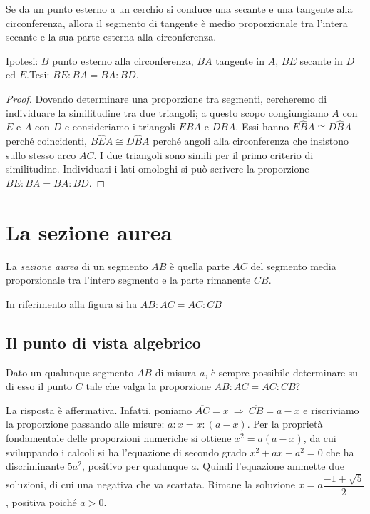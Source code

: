 \begin{teorema}
Se da un punto esterno a un cerchio si conduce una secante e una tangente alla circonferenza, allora il segmento di tangente è medio proporzionale tra l'intera secante e la sua parte esterna alla circonferenza.
\end{teorema}

\noindent Ipotesi: $B$ punto esterno alla circonferenza, $BA$ tangente in $A$, $BE$ secante in $D$ ed $E$.\tab Tesi: $BE:BA=BA:BD$.

\begin{proof}
Dovendo determinare una proporzione tra segmenti, cercheremo di individuare la similitudine tra due triangoli; a questo scopo congiungiamo $A$ con $E$ e $A$ con $D$ e consideriamo i triangoli $EBA$ e $DBA$. Essi hanno $E\widehat{B}A\cong D\widehat{B}A$ perché coincidenti, $B\widehat{E}A\cong D\widehat{B}A$ perché angoli alla circonferenza che insistono sullo stesso arco $AC$. I due triangoli sono simili per il primo criterio di similitudine. Individuati i lati omologhi si può scrivere la proporzione $BE:BA=BA:BD$.
\end{proof}

\section{La sezione aurea}

\begin{definizione}
La \emph{sezione aurea} di un segmento $AB$ è quella parte $AC$ del segmento media proporzionale tra l'intero segmento e la parte rimanente $CB$.
\end{definizione}

In riferimento alla figura si ha $AB : AC = AC : CB$

\subsection{Il punto di vista algebrico}

Dato un qualunque segmento $AB$ di misura $a$, è sempre possibile determinare su di esso il punto $C$ tale che valga la proporzione $AB : AC = AC : CB$?

La risposta è affermativa. Infatti, poniamo $\overline{AC}=x\:\Rightarrow\:\overline{CB}=a-x$ e riscriviamo la proporzione passando alle misure: $a : x = x : (a-x)$.
Per la proprietà fondamentale delle proporzioni numeriche si ottiene $x^2=a(a-x)$, da cui  sviluppando i calcoli si ha l'equazione di secondo grado $x^2+ax-a^2=0$ che ha discriminante $5a^2$, positivo per qualunque $a$. Quindi l'equazione ammette due soluzioni, di cui una negativa che va scartata. Rimane la soluzione $x=a\dfrac{-1+\sqrt{5}}{2}$, positiva poiché $a>0$.

